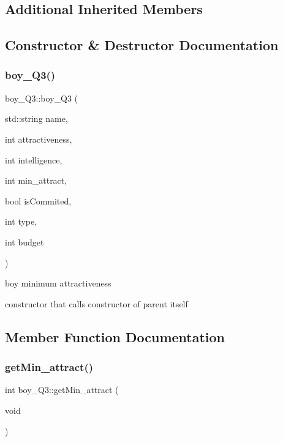 \subsection*{Additional Inherited Members}


\subsection{Constructor \& Destructor Documentation}
\mbox{\label{classboy___q3_a18bbddd5a186cc05ec12d7e9213924b4}} 
\subsubsection{\texorpdfstring{boy\+\_\+\+Q3()}{boy\_Q3()}}
{\footnotesize\ttfamily boy\+\_\+\+Q3\+::boy\+\_\+\+Q3 (\begin{DoxyParamCaption}\item[{std\+::string}]{name,  }\item[{int}]{attractiveness,  }\item[{int}]{intelligence,  }\item[{int}]{min\+\_\+attract,  }\item[{bool}]{is\+Commited,  }\item[{int}]{type,  }\item[{int}]{budget }\end{DoxyParamCaption})}



boy minimum attractiveness 

constructor that calls constructor of parent itself 

\subsection{Member Function Documentation}
\mbox{\label{classboy___q3_adf326922fe56a18158161d0d41ebfe6d}} 
\subsubsection{\texorpdfstring{get\+Min\+\_\+attract()}{getMin\_attract()}\hspace{0.1cm}{\footnotesize\ttfamily [1/2]}}
{\footnotesize\ttfamily int boy\+\_\+\+Q3\+::get\+Min\+\_\+attract (\begin{DoxyParamCaption}\item[{void}]{ }\end{DoxyParamCaption})}

